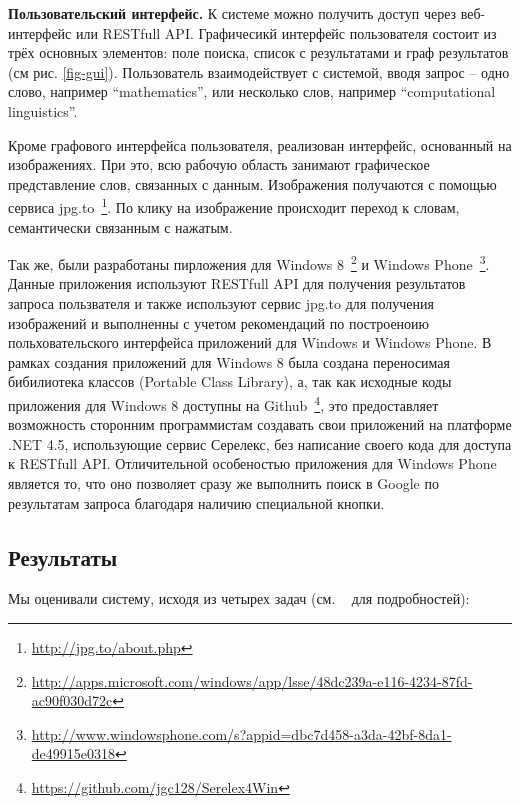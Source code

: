 \documentclass[a4paper,10pt,twoside]{article}
\begin{document}
\textbf{Пользовательский интерфейс.} К системе можно получить доступ через веб-интерфейс или RESTfull API. Графичесикй интерфейс пользователя состоит из трёх основных элементов: поле поиска, список с результатами и граф результатов (см рис. \ref{fig-gui}). Пользователь взаимодействует с системой, вводя запрос -- одно слово, например ``mathematics'', или несколько слов, например ``computational linguistics''. 


Кроме графового интерфейса пользователя, реализован интерфейс, основанный на изображениях. При это, всю рабочую область занимают графическое представление слов, связанных с данным. Изображения получаются с помощью сервиса jpg.to~\footnote{\url{http://jpg.to/about.php}}. По клику на изображение происходит переход к словам, семантически связанным с нажатым.


Так же, были разработаны пирложения для Windows 8~\footnote{\url{http://apps.microsoft.com/windows/app/lsse/48dc239a-e116-4234-87fd-ac90f030d72c}} и Windows Phone~\footnote{\url{http://www.windowsphone.com/s?appid=dbc7d458-a3da-42bf-8da1-de49915e0318}}. Данные приложения используют RESTfull API для получения результатов запроса пользвателя и также используют сервис jpg.to для получения изображений и выполненны с учетом рекомендаций по построеноию польховательского интерфейса приложений для Windows и Windows Phone. В рамках создания приложений для Windows 8 была создана переносимая бибилиотека классов (Portable Class Library), а, так как исходные коды приложения для Windows 8 доступны на Github~\footnote{\url{https://github.com/jgc128/Serelex4Win}}, это предоставляет возможность сторонним программистам создавать свои приложений на платформе .NET 4.5, использующие сервис Серелекс, без написание своего кода для доступа к RESTfull API. Отличительной особеностью приложения для Windows Phone является то, что оно 
позволяет сразу же выполнить поиск в Google по результатам запроса благодаря наличию специальной кнопки.



\subsection{Результаты}
Мы оценивали систему, исходя из четырех задач (см. ~\cite{panchenko2012konvens} для подробностей):
\end{document}
